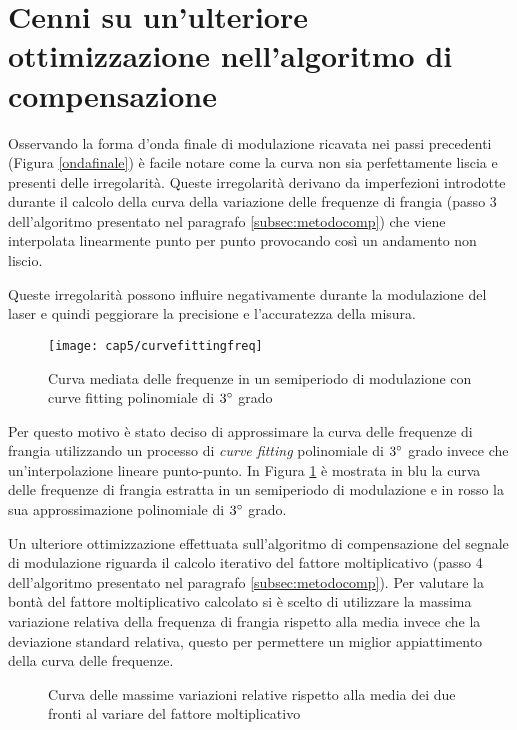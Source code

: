 \section{Cenni su un'ulteriore ottimizzazione nell'algoritmo di compensazione}
Osservando la forma d'onda finale di modulazione ricavata nei passi precedenti (Figura \ref{ondafinale}) è facile notare come la curva non sia perfettamente liscia e presenti delle irregolarità.
Queste irregolarità derivano da imperfezioni introdotte durante il calcolo della curva della variazione delle frequenze di frangia (passo $3$ dell'algoritmo presentato nel paragrafo \ref{subsec:metodocomp}) che viene interpolata linearmente punto per punto provocando così un andamento non liscio. 

Queste irregolarità possono influire negativamente durante la modulazione del laser e quindi peggiorare la precisione e l'accuratezza della misura. 
\begin{figure}  
  \begin{center}
    \texttt{[image: cap5/curvefittingfreq]}
    \caption{Curva mediata delle frequenze in un semiperiodo di modulazione con curve fitting polinomiale di $3\degree$ grado}
    \label{curvefittingfreq}
  \end{center}
\end{figure}

Per questo motivo è stato deciso di approssimare la curva delle frequenze di frangia utilizzando un processo di \textit{curve fitting} polinomiale di $3\degree$ grado invece che un'interpolazione lineare punto-punto. In Figura \ref{curvefittingfreq} è mostrata in blu la curva delle frequenze di frangia estratta in un semiperiodo di modulazione e in rosso la sua approssimazione polinomiale di $3\degree$ grado.

Un ulteriore ottimizzazione effettuata sull'algoritmo di compensazione del segnale di modulazione riguarda il calcolo iterativo del fattore moltiplicativo (passo 4 dell'algoritmo presentato nel paragrafo \ref{subsec:metodocomp}). Per valutare la bontà del fattore moltiplicativo calcolato si è scelto di utilizzare la massima variazione relativa della frequenza di frangia rispetto alla media invece che la deviazione standard relativa, questo per permettere un miglior appiattimento della curva delle frequenze.

\begin{figure}
\centering
{}
\hspace{5mm}
\caption{Curva delle massime variazioni relative rispetto alla media dei due fronti al variare del fattore moltiplicativo}\label{mulfactnew}
\end{figure}

